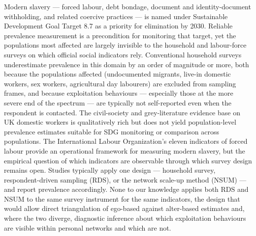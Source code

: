 \documentclass[
  12pt,
  letterpaper,
  DIV=11,
  numbers=noendperiod]{scrartcl}
\begin{document}
Modern slavery --- forced labour, debt bondage, document and
identity-document withholding, and related coercive practices --- is
named under Sustainable Development Goal Target 8.7 as a priority for
elimination by 2030. Reliable prevalence measurement is a precondition
for monitoring that target, yet the populations most affected are
largely invisible to the household and labour-force surveys on which
official social indicators rely. Conventional household surveys
underestimate prevalence in this domain by an order of magnitude or
more, both because the populations affected (undocumented migrants,
live-in domestic workers, sex workers, agricultural day labourers) are
excluded from sampling frames, and because exploitation behaviours ---
especially those at the more severe end of the spectrum --- are
typically not self-reported even when the respondent is contacted. The
civil-society and grey-literature evidence base on UK domestic workers
\autocite{kala08-new,serv23-closed} is qualitatively rich but does not
yield population-level prevalence estimates suitable for SDG monitoring
or comparison across populations. The International Labour
Organization's eleven indicators of forced labour
\autocite{ILO11-indicators,international_labour_organization_global_2017}
provide an operational framework for measuring modern slavery, but the
empirical question of which indicators are observable through which
survey design remains open. Studies typically apply one design ---
household survey, respondent-driven sampling (RDS), or the network
scale-up method (NSUM) --- and report prevalence accordingly. None to
our knowledge applies both RDS and NSUM to the same survey instrument
for the same indicators, the design that would allow direct
triangulation of ego-based against alter-based estimates and, where the
two diverge, diagnostic inference about which exploitation behaviours
are visible within personal networks and which are not.
\end{document}
